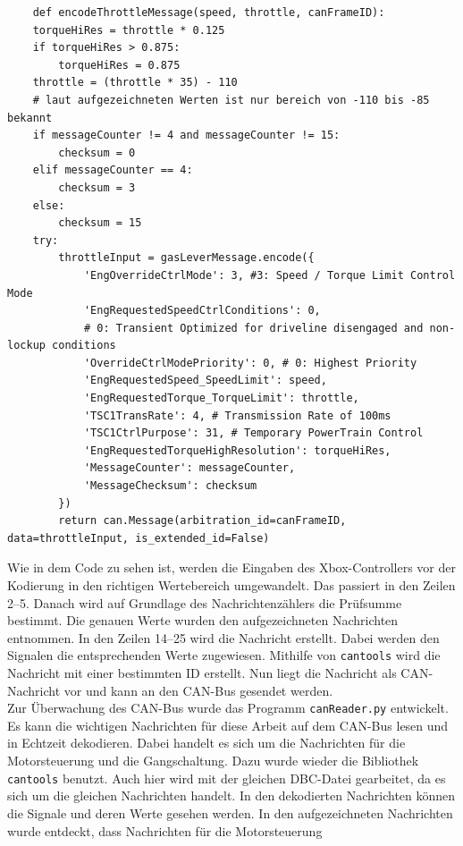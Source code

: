 \begin{verbatim}
    def encodeThrottleMessage(speed, throttle, canFrameID):
    torqueHiRes = throttle * 0.125
    if torqueHiRes > 0.875:
        torqueHiRes = 0.875
    throttle = (throttle * 35) - 110 
    # laut aufgezeichneten Werten ist nur bereich von -110 bis -85 bekannt
    if messageCounter != 4 and messageCounter != 15: 
        checksum = 0
    elif messageCounter == 4:
        checksum = 3
    else:
        checksum = 15
    try:
        throttleInput = gasLeverMessage.encode({ 
            'EngOverrideCtrlMode': 3, #3: Speed / Torque Limit Control Mode
            'EngRequestedSpeedCtrlConditions': 0, 
            # 0: Transient Optimized for driveline disengaged and non-lockup conditions
            'OverrideCtrlModePriority': 0, # 0: Highest Priority
            'EngRequestedSpeed_SpeedLimit': speed,
            'EngRequestedTorque_TorqueLimit': throttle,
            'TSC1TransRate': 4, # Transmission Rate of 100ms
            'TSC1CtrlPurpose': 31, # Temporary PowerTrain Control
            'EngRequestedTorqueHighResolution': torqueHiRes,
            'MessageCounter': messageCounter,
            'MessageChecksum': checksum
        })
        return can.Message(arbitration_id=canFrameID, data=throttleInput, is_extended_id=False)
\end{verbatim}
Wie in dem Code zu sehen ist, werden die Eingaben des Xbox-Controllers vor der Kodierung in den richtigen Wertebereich umgewandelt.
Das passiert in den Zeilen 2--5. Danach wird auf Grundlage des Nachrichtenzählers die Prüfsumme bestimmt. Die genauen Werte wurden 
den aufgezeichneten Nachrichten entnommen. In den Zeilen 14--25 wird die Nachricht erstellt. Dabei werden den Signalen die entsprechenden
Werte zugewiesen. Mithilfe von \texttt{cantools} wird die Nachricht mit einer bestimmten ID erstellt. Nun liegt die Nachricht als
CAN-Nachricht vor und kann an den CAN-Bus gesendet werden.
\\
Zur Überwachung des CAN-Bus wurde das Programm \texttt{canReader.py} entwickelt. Es kann die wichtigen Nachrichten für diese Arbeit 
auf dem CAN-Bus lesen und in Echtzeit dekodieren. Dabei handelt es sich um die Nachrichten für die Motorsteuerung und die Gangschaltung.
Dazu wurde wieder die Bibliothek \texttt{cantools} benutzt. Auch hier wird
mit der gleichen DBC-Datei gearbeitet, da es sich um die gleichen Nachrichten handelt. In den dekodierten Nachrichten
können die Signale und deren Werte gesehen werden. 
In den aufgezeichneten Nachrichten wurde entdeckt, dass Nachrichten für die Motorsteuerung
